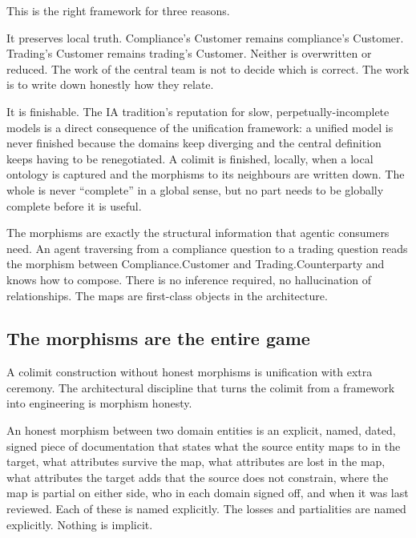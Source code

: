 \documentclass[11pt,a4paper]{article}
\begin{document}
This is the right framework for three reasons.

It preserves local truth. Compliance's Customer remains compliance's Customer. Trading's Customer remains trading's Customer. Neither is overwritten or reduced. The work of the central team is not to decide which is correct. The work is to write down honestly how they relate.

It is finishable. The IA tradition's reputation for slow, perpetually-incomplete models is a direct consequence of the unification framework: a unified model is never finished because the domains keep diverging and the central definition keeps having to be renegotiated. A colimit is finished, locally, when a local ontology is captured and the morphisms to its neighbours are written down. The whole is never ``complete'' in a global sense, but no part needs to be globally complete before it is useful.

The morphisms are exactly the structural information that agentic consumers need. An agent traversing from a compliance question to a trading question reads the morphism between Compliance.Customer and Trading.Counterparty and knows how to compose. There is no inference required, no hallucination of relationships. The maps are first-class objects in the architecture.

\subsection{The morphisms are the entire game}

A colimit construction without honest morphisms is unification with extra ceremony. The architectural discipline that turns the colimit from a framework into engineering is morphism honesty.

An honest morphism between two domain entities is an explicit, named, dated, signed piece of documentation that states what the source entity maps to in the target, what attributes survive the map, what attributes are lost in the map, what attributes the target adds that the source does not constrain, where the map is partial on either side, who in each domain signed off, and when it was last reviewed. Each of these is named explicitly. The losses and partialities are named explicitly. Nothing is implicit.
\end{document}
